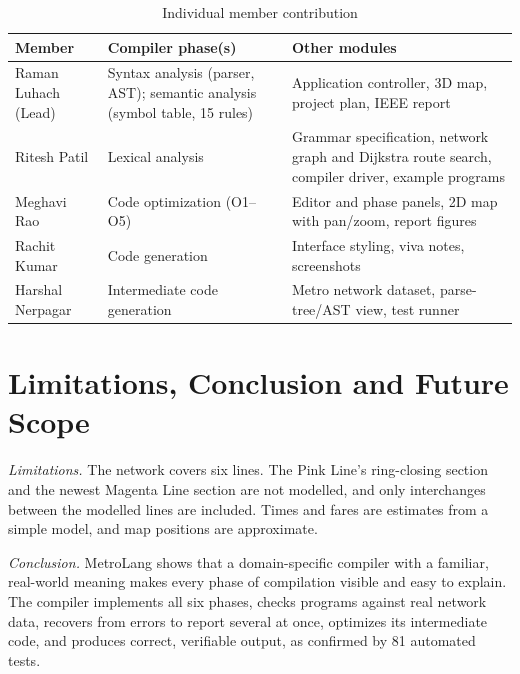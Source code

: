 \documentclass[conference]{IEEEtran}
\begin{document}
\begin{table}[t]
\caption{Individual member contribution}\label{tab:contrib}
\centering
\footnotesize
\begin{tabular}{@{}>{\raggedright\arraybackslash}p{}>{\raggedright\arraybackslash}p{}>{\raggedright\arraybackslash}p{}@{}}
\toprule
\textbf{Member} & \textbf{Compiler phase(s)} & \textbf{Other modules} \\
\midrule
Raman Luhach (Lead) & Syntax analysis (parser, AST); semantic analysis (symbol table, 15 rules) & Application controller, 3D map, project plan, IEEE report \\
Ritesh Patil & Lexical analysis & Grammar specification, network graph and Dijkstra route search, compiler driver, example programs \\
Meghavi Rao & Code optimization (O1--O5) & Editor and phase panels, 2D map with pan/zoom, report figures \\
Rachit Kumar & Code generation & Interface styling, viva notes, screenshots \\
Harshal Nerpagar & Intermediate code generation & Metro network dataset, parse-tree/AST view, test runner \\
\bottomrule
\end{tabular}
\end{table}

\section{Limitations, Conclusion and Future Scope}
\emph{Limitations.} The network covers six lines. The Pink Line's ring-closing section and the newest Magenta Line section are not modelled, and only interchanges between the modelled lines are included. Times and fares are estimates from a simple model, and map positions are approximate.

\emph{Conclusion.} MetroLang shows that a domain-specific compiler with a familiar, real-world meaning makes every phase of compilation visible and easy to explain. The compiler implements all six phases, checks programs against real network data, recovers from errors to report several at once, optimizes its intermediate code, and produces correct, verifiable output, as confirmed by 81 automated tests.
\end{document}
